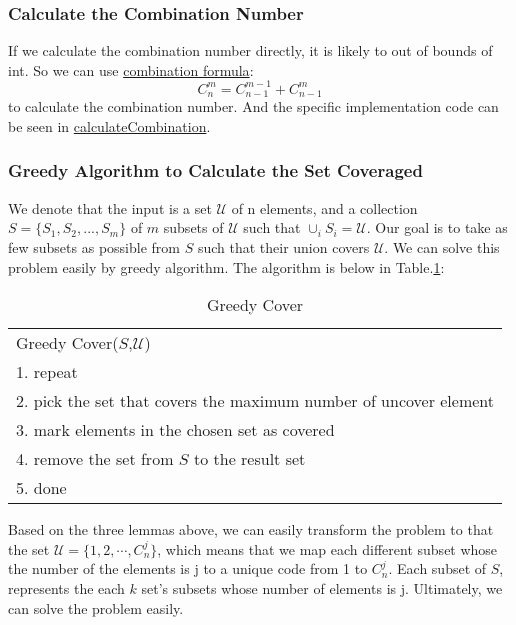     \subsubsection{Calculate the Combination Number}
    If we calculate the combination number directly, it is likely to out of bounds of int. So we can use \hyperref[fol:C]{combination formula}:
    \label{fol:C}$$C_n^m=C_{n-1}^{m-1}+C_{n-1}^m$$ 
    to calculate the combination number. And the specific implementation code can be seen in \hyperref[code:calComb]{calculateCombination}.
   \label{code:calComb}
   
    
    \subsubsection{Greedy Algorithm to Calculate the Set Coveraged}
    We denote that the input is a set $\mathcal{U}$ of n elements, and a collection $S=\{S_1, S_2, . . . , S_m\}$ of $m$ subsets of $\mathcal{U}$ such that
    $\cup_{i} S_i=\mathcal{U}$. Our goal is to take as few subsets as possible from $S$ such that their union covers $\mathcal{U}$.
    We can solve this problem easily by greedy algorithm. The algorithm is below in Table.\ref{tab:Greedy Cover}:
    \begin{table}[!hpbt]
        \centering
        \begin{tabular}{|l|}
        \hline
        Greedy Cover($S$,$\mathcal{U}$)                                       \\
        1. repeat                                                             \\
        2.     pick the set that covers the maximum number of uncover element \\
        3.     mark elements in the chosen set as covered                     \\
        4.     remove the set from $S$ to the result set                      \\
        5. done                                                               \\ \hline
        \end{tabular}
        \caption{Greedy Cover}
        \label{tab:Greedy Cover}
    \end{table}

Based on the three lemmas above, we can easily transform the problem to that the set $\mathcal{U}=\{1,2,\cdots, C^j_n\}$, which means that we map each different subset 
whose the number of the elements is j to a unique code from 1 to $ C^j_n$. Each subset of $S$, represents the each $k$ set's subsets whose number of elements is j. Ultimately, 
we can solve the problem easily.
